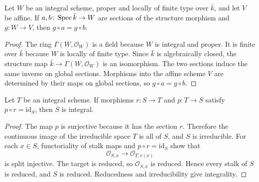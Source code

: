 \begin{lemma}
  \label{mk-lem:eq_comp_of_isAffine_of_properIntegral}
  \leanok

  Let \(W\) be an integral scheme, proper and locally of finite type over \(\bar k\),
  and let \(V\) be affine.  If \(a,b\colon\operatorname{Spec}\bar k\to W\) are sections of the
  structure morphism and \(g\colon W\to V\), then \(g\circ a=g\circ b\).
\end{lemma}
\begin{proof}
  \leanok
  The ring \(\Gamma(W,\mathcal O_W)\) is a field because \(W\) is integral and
  proper.  It is finite over \(\bar k\) because \(W\) is locally of finite type.
  Since \(\bar k\) is algebraically closed, the structure map
  \(\bar k\to\Gamma(W,\mathcal O_W)\) is an isomorphism.  The two sections induce
  the same inverse on global sections.  Morphisms into the affine scheme \(V\) are
  determined by their maps on global sections, so \(g\circ a=g\circ b\).
\end{proof}

\begin{lemma}
  \label{mk-lem:isIntegral_of_retract_of_integral}
  \leanok

  Let \(T\) be an integral scheme.  If morphisms \(r\colon S\to T\) and
  \(p\colon T\to S\) satisfy \(p\circ r=\mathrm{id}_S\), then \(S\) is integral.
\end{lemma}
\begin{proof}
  \leanok
  The map \(p\) is surjective because it has the section \(r\).  Therefore the
  continuous image of the irreducible space \(T\) is all of \(S\), and \(S\) is
  irreducible.  For each \(x\in S\), functoriality of stalk maps and
  \(p\circ r=\mathrm{id}_S\) show that
  \[
    \mathcal O_{S,x}\longrightarrow\mathcal O_{T,r(x)}
  \]
  is split injective.  The target is reduced, so \(\mathcal O_{S,x}\) is reduced.
  Hence every stalk of \(S\) is reduced, and \(S\) is reduced.  Reducedness and
  irreducibility give integrality.
\end{proof}

